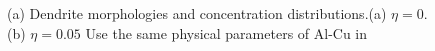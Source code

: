 \documentclass[final,times]{elsarticle}
\numberwithin{equation}{section}
\begin{document}
 \begin{figure}[!ht]
 \centering
     \hfill
     
     \caption{(a) Dendrite morphologies and concentration distributions.(a) $\eta=0$. (b) $\eta=0.05$ Use the same physical parameters of Al-Cu in \cite{Takaki2014}}
     \label{fig:Ech}
   \end{figure}
   














\end{document}
